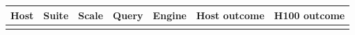 \begin{longtable}{lllllll}
\toprule
Host & Suite & Scale & Query & Engine & Host outcome & H100 outcome \\
\midrule
\endhead
\bottomrule
\endfoot
\end{longtable}
